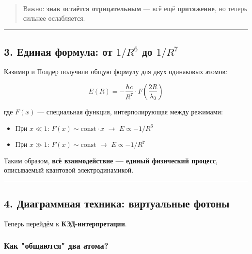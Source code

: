 \documentclass[11pt]{article}
\providecommand{\tightlist}{%
      \setlength{\itemsep}{0pt}\setlength{\parskip}{0pt}}
\begin{document}
\begin{quote}
Важно: \textbf{знак остаётся отрицательным} --- всё ещё
\textbf{притяжение}, но теперь сильнее ослабляется.
\end{quote}

\begin{center}\rule{0.5\linewidth}{\linethickness}\end{center}

\subsection{\texorpdfstring{3. Единая формула: от \(1/R^6\) до
\(1/R^7\)}{3. Единая формула: от 1/R\^{}6 до 1/R\^{}7}}\label{ux435ux434ux438ux43dux430ux44f-ux444ux43eux440ux43cux443ux43bux430-ux43eux442-1r6-ux434ux43e-1r7}

Казимир и Полдер получили общую формулу для двух одинаковых атомов:

\[
E(R) = -\frac{\hbar c}{R^7} \cdot F\left( \frac{2R}{\lambda_0} \right)
\]

где \(F(x)\) --- специальная функция, интерполирующая между режимами:

\begin{itemize}
\tightlist
\item
  При \(x \ll 1\): \(F(x) \sim \text{const} \cdot x\) $\rightarrow$
  \(E \propto -1/R^6\)
\item
  При \(x \gg 1\): \(F(x) \sim \text{const}\) $\rightarrow$
  \(E \propto -1/R^7\)
\end{itemize}

Таким образом, \textbf{всё взаимодействие --- единый физический
процесс}, описываемый квантовой электродинамикой.

\begin{center}\rule{0.5\linewidth}{\linethickness}\end{center}

\subsection{4. Диаграммная техника: виртуальные
фотоны}\label{ux434ux438ux430ux433ux440ux430ux43cux43cux43dux430ux44f-ux442ux435ux445ux43dux438ux43aux430-ux432ux438ux440ux442ux443ux430ux43bux44cux43dux44bux435-ux444ux43eux442ux43eux43dux44b}

Теперь перейдём к \textbf{КЭД-интерпретации}.

\subsubsection{Как "общаются" два
атома?}\label{ux43aux430ux43a-ux43eux431ux449ux430ux44eux442ux441ux44f-ux434ux432ux430-ux430ux442ux43eux43cux430}
\end{document}

